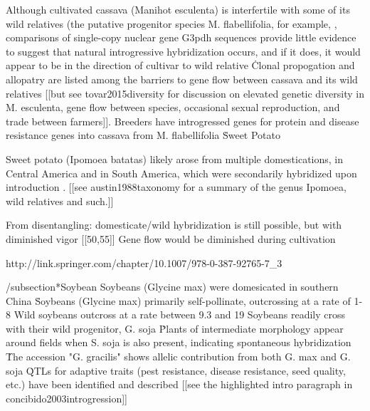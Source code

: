 \documentclass[11pt]{article}
\begin{document}
Although cultivated cassava (Manihot esculenta) is interfertile with some of its wild relatives (the putative progenitor species M. flabellifolia, for example, \cite{roa1997aflp}\), comparisons of single-copy nuclear gene G3pdh sequences provide little evidence to suggest that natural introgressive hybridization occurs, and if it does, it would appear to be in the direction of cultivar to wild relative \cite{olsen1999evidence}\.
Clonal propogation and allopatry are listed among the barriers to gene flow between cassava and its wild relatives [[but see tovar2015diversity for discussion on elevated genetic diversity in M. esculenta, gene flow between species, occasional sexual reproduction, and trade between farmers]].
Breeders have introgressed genes for protein and disease resistance genes into cassava from M. flabellifolia \cite{akinbo2008introgression}\.












Sweet Potato

Sweet potato (Ipomoea batatas) likely arose from multiple domestications, in Central America and in South America, which were secondarily hybridized upon introduction \cite{roullier2013disentangling}.  [[see austin1988taxonomy for a summary of the genus Ipomoea, wild relatives and such.]]

From disentangling:
domesticate/wild hybridization is still possible, but with diminished vigor [[50,55]]
Gene flow would be diminished during cultivation

http://link.springer.com/chapter/10.1007/978-0-387-92765-7_3









/subsection*{Soybean}
Soybeans (Glycine max) were domesicated in southern China \cite{guo2010single}\.
Soybeans (Glycine max) primarily self-pollinate, outcrossing at a rate of 1-8%
Wild soybeans outcross at a rate between 9.3 and 19%
Soybeans readily cross with their wild progenitor, G. soja \cite{singh1988genomic}\.
Plants of intermediate morphology appear around fields when S. soja is also present, indicating spontaneous hybridization \cite{kwon1972studies}\.
The accession "G. gracilis" shows allelic contribution from both G. max and G. soja \cite{keim1989restriction}\.
QTLs for adaptive traits (pest resistance, disease resistance, seed quality, etc.) have been identified and described [[see the highlighted intro paragraph in concibido2003introgression]]
\end{document}
